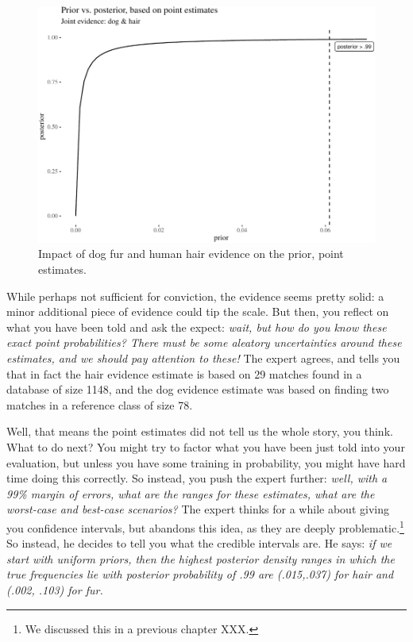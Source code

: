 \documentclass[
  10pt,
  dvipsnames,enabledeprecatedfontcommands]{scrartcl}
\begin{document}
\begin{figure}[H]


\begin{center}\includegraphics[width=0.8\linewidth]{chapter-outline_files/figure-latex/impactOfPoint4-1} \end{center}

\caption{Impact of dog fur and human hair evidence on the prior, point estimates.}

\label{fig:impactOfPoint}

\end{figure}

While perhaps not sufficient for conviction, the evidence seems pretty
solid: a minor additional piece of evidence could tip the scale. But
then, you reflect on what you have been told and ask the expect:
\emph{wait, but how do you know these exact point probabilities? There must be some aleatory uncertainties around these estimates, and we should pay attention to these!}
The expert agrees, and tells you that in fact the hair evidence estimate
is based on 29 matches found in a database of size 1148, and the dog
evidence estimate was based on finding two matches in a reference class
of size 78.

Well, that means the point estimates did not tell us the whole story,
you think. What to do next? You might try to factor what you have been
just told into your evaluation, but unless you have some training in
probability, you might have hard time doing this correctly. So instead,
you push the expert further:
\emph{well, with a 99\% margin of errors, what are the ranges for these estimates, what are the worst-case and best-case scenarios?}
The expert thinks for a while about giving you confidence intervals, but
abandons this idea, as they are deeply problematic.\footnote{We
  discussed this in a previous chapter XXX.} So instead, he decides to
tell you what the credible intervals are. He says:
\emph{if we start with uniform priors, then the  highest posterior density ranges in which the true frequencies lie with posterior probability of .99 are (.015,.037) for hair and (.002, .103) for fur.}
\end{document}
